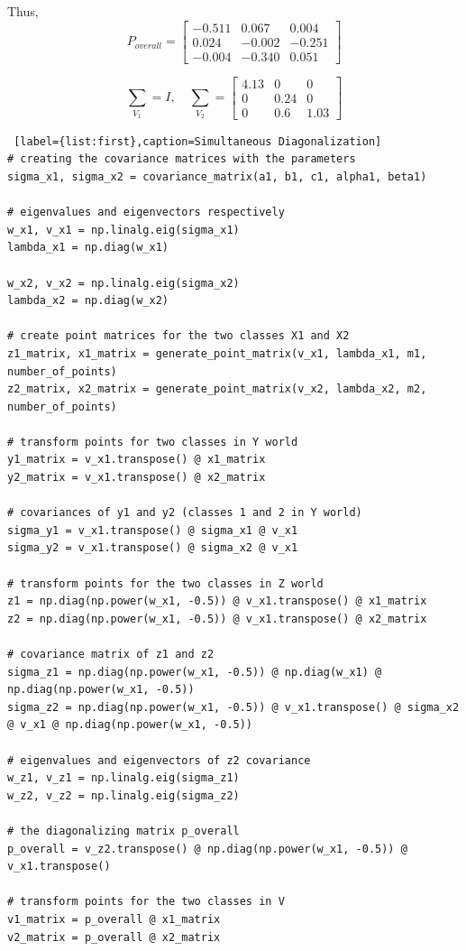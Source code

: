 \documentclass[11pt, oneside]{article}   	%
\begin{document}
Thus, $$P_{overall} = \begin{bmatrix}
-0.511 & 0.067 & 0.004 \\
0.024 & -0.002 & -0.251 \\
-0.004 & -0.340 & 0.051 
\end{bmatrix}$$

$$\sum_{V_1} = I, \quad \sum_{V_2} = \begin{bmatrix}
4.13 & 0 & 0 \\
0 & 0.24 & 0 \\
0 & 0.6 & 1.03 
\end{bmatrix}$$

\begin{lstlisting} [label={list:first},caption=Simultaneous Diagonalization]
# creating the covariance matrices with the parameters
sigma_x1, sigma_x2 = covariance_matrix(a1, b1, c1, alpha1, beta1)

# eigenvalues and eigenvectors respectively
w_x1, v_x1 = np.linalg.eig(sigma_x1)
lambda_x1 = np.diag(w_x1)

w_x2, v_x2 = np.linalg.eig(sigma_x2)
lambda_x2 = np.diag(w_x2)

# create point matrices for the two classes X1 and X2
z1_matrix, x1_matrix = generate_point_matrix(v_x1, lambda_x1, m1, number_of_points)
z2_matrix, x2_matrix = generate_point_matrix(v_x2, lambda_x2, m2, number_of_points)

# transform points for two classes in Y world
y1_matrix = v_x1.transpose() @ x1_matrix
y2_matrix = v_x1.transpose() @ x2_matrix

# covariances of y1 and y2 (classes 1 and 2 in Y world)
sigma_y1 = v_x1.transpose() @ sigma_x1 @ v_x1
sigma_y2 = v_x1.transpose() @ sigma_x2 @ v_x1

# transform points for the two classes in Z world
z1 = np.diag(np.power(w_x1, -0.5)) @ v_x1.transpose() @ x1_matrix
z2 = np.diag(np.power(w_x1, -0.5)) @ v_x1.transpose() @ x2_matrix

# covariance matrix of z1 and z2
sigma_z1 = np.diag(np.power(w_x1, -0.5)) @ np.diag(w_x1) @ np.diag(np.power(w_x1, -0.5))
sigma_z2 = np.diag(np.power(w_x1, -0.5)) @ v_x1.transpose() @ sigma_x2 @ v_x1 @ np.diag(np.power(w_x1, -0.5))

# eigenvalues and eigenvectors of z2 covariance
w_z1, v_z1 = np.linalg.eig(sigma_z1)
w_z2, v_z2 = np.linalg.eig(sigma_z2)

# the diagonalizing matrix p_overall
p_overall = v_z2.transpose() @ np.diag(np.power(w_x1, -0.5)) @ v_x1.transpose()

# transform points for the two classes in V
v1_matrix = p_overall @ x1_matrix
v2_matrix = p_overall @ x2_matrix
\end{lstlisting}
\end{document}
